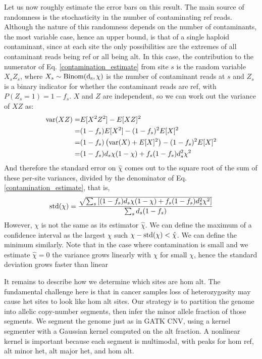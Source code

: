 \documentclass[nofootinbib,amssymb,amsmath]{revtex4}
\begin{document}
Let us now roughly estimate the error bars on this result.  The main source of randomness is the stochasticity in the number of contaminating ref reads.  Although the nature of this randomness depends on the number of contaminants, the most variable case, hence an upper bound, is that of a single haploid contaminant, since at each site the only possibilities are the extremes of all contaminant reads being ref or all being alt.  In this case, the contribution to the numerator of Eq. \ref{contamination_estimate} from site $s$ is the random variable $X_sZ_s$, where $X_s \sim {\rm Binom(d_s, \chi)}$ is the number of contaminant reads at $s$ and $Z_s$ is a binary indicator for whether the contaminant reads are ref, with $P(Z_s=1) = 1 - f_s$.  $X$ and $Z$ are independent, so we can work out the variance of $XZ$ as:
\begin{align}
{\rm var}(XZ) =& E[X^2Z^2] - E[XZ]^2 \\
=& (1 - f_s) E[X^2] - (1-f_s)^2 E[X]^2 \\
=& (1 - f_s) \left( {\rm var}(X) + E[X]^2 \right) - (1 - f_s)^2E[X]^2 \\
=& (1 - f_s) d_s \chi(1 - \chi) + f_s(1 - f_s) d_s^2 \chi^2
\end{align}
And therefore the standard error on $\hat{\chi}$ comes out to the square root of the sum of these per-site variances, divided by the denominator of Eq. \ref{contamination_estimate}, that is,
\begin{equation}
{\rm std}(\chi) = \frac{\sqrt{  \sum_s \left[ (1 - f_s) d_s \chi(1 - \chi) + f_s(1 - f_s) d_s^2 \chi^2  \right] }}{\sum_s d_s (1 - f_s) }
\end{equation}
However, $\chi$ is not the same as its estimator $\hat{\chi}$.  We can define the maximum of a confidence interval as the largest $\chi$ such $\chi - {\rm std}(\chi) < \hat{\chi}$.  We can define the minimum similarly.  Note that in the case where contamination is small and we estimate $\hat{\chi} = 0$ the variance grows linearly with $\chi$ for small $\chi$, hence the standard deviation grows faster than linear

It remains to describe how we determine which sites are hom alt.  The fundamental challenge here is that in cancer samples loss of heterozygosity may cause het sites to look like hom alt sites.  Our strategy is to partition the genome into allelic copy-number segments, then infer the minor allele fraction of those segments.  We segment the genome just as in GATK CNV, using a kernel segmenter with a Gaussian kernel computed on the alt fraction.  A nonlinear kernel is important because each segment is multimodal, with peaks for hom ref, alt minor het, alt major het, and hom alt.  
\end{document}
